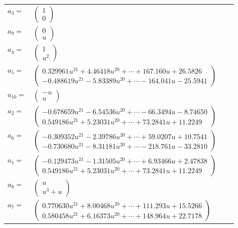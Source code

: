 \documentclass[1p]{elsarticle_modified}
\theoremstyle{definition}
\begin{document}
\begin{tabular}{m{7pt} m{180pt} m{7pt} m{180pt} }
\flushright $a_{3}=$&$\begin{pmatrix}1\\0\end{pmatrix}$ \\
\flushright $a_{9}=$&$\begin{pmatrix}0\\u\end{pmatrix}$ \\
\flushright $a_{4}=$&$\begin{pmatrix}1\\u^2\end{pmatrix}$ \\
\flushright $a_{5}=$&$\begin{pmatrix}0.329961 u^{21}+4.46418 u^{20}+\cdots+167.160 u+26.5826\\-0.488619 u^{21}-5.83389 u^{20}+\cdots-164.041 u-25.5941\end{pmatrix}$ \\
\flushright $a_{10}=$&$\begin{pmatrix}- u\\u\end{pmatrix}$ \\
\flushright $a_{2}=$&$\begin{pmatrix}-0.678659 u^{21}-6.54536 u^{20}+\cdots-66.3494 u-8.74650\\0.549186 u^{21}+5.23031 u^{20}+\cdots+73.2841 u+11.2249\end{pmatrix}$ \\
\flushright $a_{6}=$&$\begin{pmatrix}-0.309352 u^{21}-2.39786 u^{20}+\cdots+59.0207 u+10.7541\\-0.730680 u^{21}-8.31181 u^{20}+\cdots-218.761 u-33.2810\end{pmatrix}$ \\
\flushright $a_{1}=$&$\begin{pmatrix}-0.129473 u^{21}-1.31505 u^{20}+\cdots+6.93466 u+2.47838\\0.549186 u^{21}+5.23031 u^{20}+\cdots+73.2841 u+11.2249\end{pmatrix}$ \\
\flushright $a_{8}=$&$\begin{pmatrix}u\\u^3+u\end{pmatrix}$ \\
\flushright $a_{7}=$&$\begin{pmatrix}0.770630 u^{21}+8.00468 u^{20}+\cdots+111.293 u+15.5266\\0.580458 u^{21}+6.16373 u^{20}+\cdots+148.964 u+22.7178\end{pmatrix}$ \\

\end{tabular}
\end{document}
